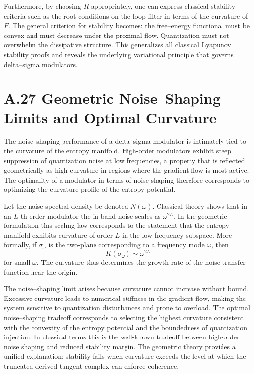 Furthermore, by choosing \(R\) appropriately, one can express classical stability criteria such as the root conditions on the loop filter in terms of the curvature of \(F\). The general criterion for stability becomes: the free–energy functional must be convex and must decrease under the proximal flow. Quantization must not overwhelm the dissipative structure. This generalizes all classical Lyapunov stability proofs and reveals the underlying variational principle that governs delta–sigma modulators.

\section{A.27 Geometric Noise–Shaping Limits and Optimal Curvature}

The noise–shaping performance of a delta–sigma modulator is intimately tied to the curvature of the entropy manifold. High-order modulators exhibit steep suppression of quantization noise at low frequencies, a property that is reflected geometrically as high curvature in regions where the gradient flow is most active. The optimality of a modulator in terms of noise-shaping therefore corresponds to optimizing the curvature profile of the entropy potential.

Let the noise spectral density be denoted \(N(\omega)\). Classical theory shows that in an \(L\)-th order modulator the in-band noise scales as \(\omega^{2L}\). In the geometric formulation this scaling law corresponds to the statement that the entropy manifold exhibits curvature of order \(L\) in the low-frequency subspace. More formally, if \(\sigma_\omega\) is the two-plane corresponding to a frequency mode \(\omega\), then
\[
K(\sigma_\omega) \sim \omega^{2L}
\]
for small \(\omega\). The curvature thus determines the growth rate of the noise transfer function near the origin.

The noise–shaping limit arises because curvature cannot increase without bound. Excessive curvature leads to numerical stiffness in the gradient flow, making the system sensitive to quantization disturbances and prone to overload. The optimal noise–shaping tradeoff corresponds to selecting the highest curvature consistent with the convexity of the entropy potential and the boundedness of quantization injection. In classical terms this is the well-known tradeoff between high-order noise shaping and reduced stability margin. The geometric theory provides a unified explanation: stability fails when curvature exceeds the level at which the truncated derived tangent complex can enforce coherence.

